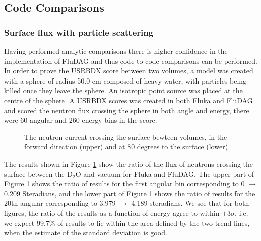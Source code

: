 \documentclass{anstrans}
\begin{document}
\subsection{Code Comparisons}
\subsubsection*{Surface flux with particle scattering}
Having performed analytic comparisons there is higher confidence in
the implementation of FluDAG and thus code to code comparisons can be
performed. In order to prove the USRBDX score between two volumes, a
model was created with a sphere of radius 50.0 cm composed of heavy
water, with particles being killed once they leave the sphere. An
isotropic point source was placed at the centre of the sphere. A
USRBDX scores was created in both Fluka and FluDAG and scored the
neutron flux crossing the sphere in both angle and energy, there were
60 angular and 260 energy bins in the score.
\begin{figure}[h!]
	\begin{center}
		\caption{The neutron current crossing the surface bewteen volumes, in the 
		forward direction (upper) and at 80 degrees to the surface (lower)}
	\end{center}
\label{mat_usrbdx}
\end{figure}
The results shown in Figure \ref{mat_usrbdx} show the ratio of the
flux of neutrons crossing the surface between the D$_2$O and vacuum
for Fluka and FluDAG. The upper part of Figure \ref{mat_usrbdx} shows
the ratio of results for the first angular bin corresponding to 0
$\to$ 0.209 Steradians, and the lower part of Figure \ref{mat_usrbdx}
shows the ratio of results for the 20th angular corresponding to 3.979
$\to$ 4.189 steradians. We see that for both figures, the ratio of the
results as a function of energy agree to within $\pm 3\sigma$, i.e. we
expect 99.7\% of results to lie within the area defined by the two
trend lines, when the estimate of the standard deviation is good.
\end{document}
